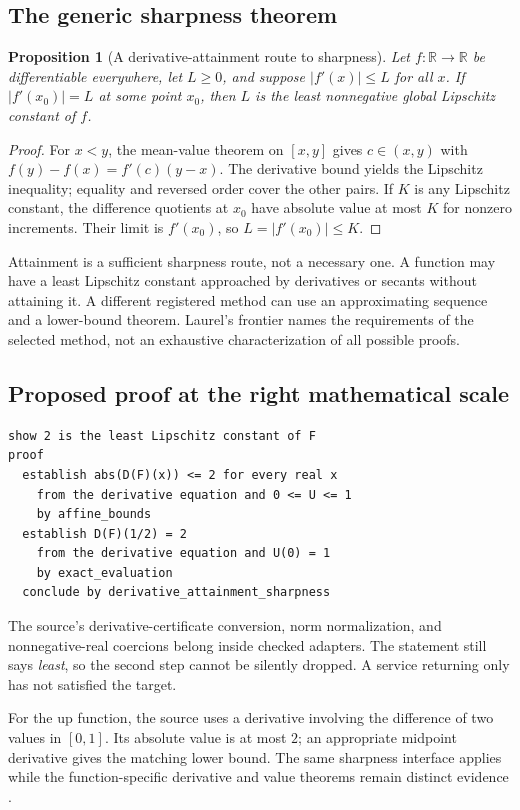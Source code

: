 \documentclass[11pt,a4paper]{article}
\newcommand{\code}[1]{\texttt{\detokenize{#1}}}
\newcommand{\R}{\mathbb R}
\newtheorem{proposition}[theorem]{Proposition}
\theoremstyle{definition}
\theoremstyle{remark}
\begin{document}
\subsection{The generic sharpness theorem}
\begin{proposition}[A derivative-attainment route to sharpness]
Let $f:\R\to\R$ be differentiable everywhere, let $L\ge0$, and suppose $|f'(x)|\le L$ for all $x$. If $|f'(x_0)|=L$ at some point $x_0$, then $L$ is the least nonnegative global Lipschitz constant of $f$.
\end{proposition}
\begin{proof}
For $x<y$, the mean-value theorem on $[x,y]$ gives $c\in(x,y)$ with $f(y)-f(x)=f'(c)(y-x)$. The derivative bound yields the Lipschitz inequality; equality and reversed order cover the other pairs. If $K$ is any Lipschitz constant, the difference quotients at $x_0$ have absolute value at most $K$ for nonzero increments. Their limit is $f'(x_0)$, so $L=|f'(x_0)|\le K$.
\end{proof}
Attainment is a sufficient sharpness route, not a necessary one. A function may have a least Lipschitz constant approached by derivatives or secants without attaining it. A different registered method can use an approximating sequence and a lower-bound theorem. Laurel's frontier names the requirements of the selected method, not an exhaustive characterization of all possible proofs.

\subsection{Proposed proof at the right mathematical scale}
\begin{lstlisting}
show 2 is the least Lipschitz constant of F
proof
  establish abs(D(F)(x)) <= 2 for every real x
    from the derivative equation and 0 <= U <= 1
    by affine_bounds
  establish D(F)(1/2) = 2
    from the derivative equation and U(0) = 1
    by exact_evaluation
  conclude by derivative_attainment_sharpness
\end{lstlisting}
The source's derivative-certificate conversion, norm normalization, and nonnegative-real coercions belong inside checked adapters. The statement still says \emph{least}, so the second step cannot be silently dropped. A service returning only \code{LipschitzWith 2 F} has not satisfied the target.

For the up function, the source uses a derivative involving the difference of two values in $[0,1]$. Its absolute value is at most $2$; an appropriate midpoint derivative gives the matching lower bound. The same sharpness interface applies while the function-specific derivative and value theorems remain distinct evidence \cite{regularity}.
\end{document}
